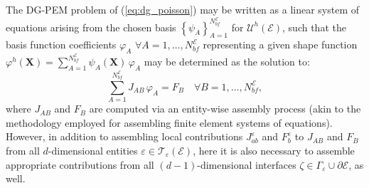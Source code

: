 	The DG-PEM problem of (\ref{eq:dg_poisson}) may be written as a linear system of equations arising from the chosen basis $\left\{ \psi_A \right\}_{A=1}^{N^\mathcal{E}_{bf}}$ for $\mathcal{U}^h (\mathcal{E})$, such that the basis function coefficients $\varphi_A \, \, \forall A = 1, \ldots, N^\mathcal{E}_{bf}$ representing a given shape function $\varphi^h (\mathbf{X}) = \sum_{A=1}^{N^\mathcal{E}_{bf}} \psi_A (\mathbf{X}) \, \varphi_A$ may be determined as the solution to:
	\begin{equation}
		\sum_{A=1}^{N^\mathcal{E}_{bf}} J_{AB} \, \varphi_A = F_B \quad \forall B = 1, \ldots, N^\mathcal{E}_{bf},
		\label{eq:linearization_dgpem}
	\end{equation}
	where $J_{AB}$ and $F_B$ are computed via an entity-wise assembly process (akin to the methodology employed for assembling finite element systems of equations). However, in addition to assembling local contributions $J^\varepsilon_{ab}$ and $F^\varepsilon_b$ to $J_{AB}$ and $F_B$ from all $d$-dimensional entities $\varepsilon \in \mathcal{T}_\varepsilon (\mathcal{E})$, here it is also necessary to assemble appropriate contributions from all $(d-1)$-dimensional interfaces $\zeta \in \Gamma_\varepsilon \cup \partial \mathcal{E}$, as well.

